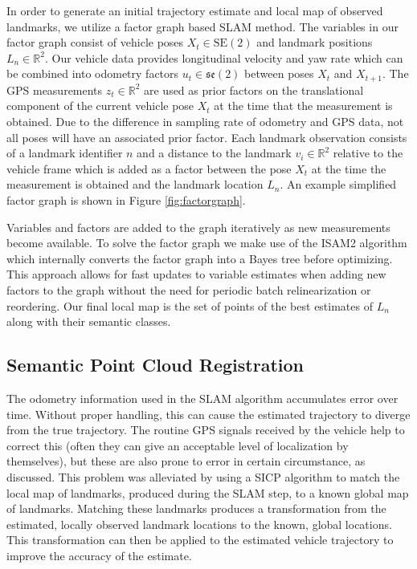 \documentclass[letterpaper, 10 pt, conference]{ieeeconf}  %
\begin{document}
In order to generate an initial trajectory estimate and local map of observed landmarks, we utilize a factor graph based SLAM method.
The variables in our factor graph consist of vehicle poses $X_t \in \mathrm{SE}(2)$ and landmark positions $L_n \in \mathbb{R}^2$.
Our vehicle data provides longitudinal velocity and yaw rate which can be combined into odometry factors $u_t \in \mathfrak{se}(2)$ between poses $X_t$ and $X_{t+1}$.
The GPS measurements $z_t \in \mathbb{R}^2$ are used as prior factors on the translational component of the current vehicle pose $X_t$ at the time that the measurement is obtained. Due to the difference in sampling rate of odometry and GPS data, not all poses will have an associated prior factor.
Each landmark observation consists of a landmark identifier $n$ and a distance to the landmark $v_i \in \mathbb{R}^2$ relative to the vehicle frame which is added as a factor between the pose $X_t$ at the time the measurement is obtained and the landmark location $L_n$.
An example simplified factor graph is shown in Figure \ref{fig:factorgraph}.

Variables and factors are added to the graph iteratively as new measurements become available.
To solve the factor graph we make use of the ISAM2 algorithm \cite{ref:isam} which internally converts the factor graph into a Bayes tree before optimizing. This approach allows for fast updates to variable estimates when adding new factors to the graph without the need for periodic batch relinearization or reordering.
Our final local map is the set of points of the best estimates of $L_n$ along with their semantic classes.

\subsection{Semantic Point Cloud Registration}
The odometry information used in the SLAM algorithm accumulates error over time. Without proper handling, this can cause the estimated trajectory to diverge from the true trajectory. The routine GPS signals received by the vehicle help to correct this (often they can give an acceptable level of localization by themselves), but these are also prone to error in certain circumstance, as discussed. This problem was alleviated by using a SICP algorithm to match the local map of landmarks, produced during the SLAM step, to a known global map of landmarks. Matching these landmarks produces a transformation from the estimated, locally observed landmark locations to the known, global locations. This transformation can then be applied to the estimated vehicle trajectory to improve the accuracy of the estimate. 
\end{document}
